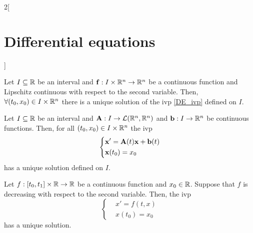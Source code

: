 \documentclass[../../../main.tex]{subfiles}
\begin{document}
\begin{multicols}{2}[\section{Differential equations}]
\begin{corollary}
  \end{corollary}
  \begin{prop}
    Let $I\subseteq\mathbb{R}$ be an interval and $\boldsymbol{\mathrm{f}}:I\times\mathbb{R}^n\rightarrow\mathbb{R}^n$ be a continuous function and Lipschitz continuous with respect to the second variable. Then, $\forall(t_0,x_0)\in I\times\mathbb{R}^n$ there is a unique solution of the ivp \eqref{DE_ivp} defined on $I$.
  \end{prop}
  \begin{corollary}
    Let $I\subseteq\mathbb{R}$ be an interval and $\boldsymbol{\mathrm{A}}:I\rightarrow\mathcal{L}(\mathbb{R}^n,\mathbb{R}^n)$ and $\boldsymbol{\mathrm{b}}:I\rightarrow\mathbb{R}^n$ be continuous functions. Then, for all $(t_0,x_0)\in I\times\mathbb{R}^n$ the ivp
    $$
      \left\{
      \begin{aligned}
         & \boldsymbol{\mathrm{x}}'=\boldsymbol{\mathrm{A}}(t)\boldsymbol{\mathrm{x}}+\boldsymbol{\mathrm{b}}(t) \\
         & \boldsymbol{\mathrm{x}}(t_0)=x_0
      \end{aligned}
      \right.
    $$
    has a unique solution defined on $I$.
  \end{corollary}
  \begin{theorem}
    Let $f:[t_0,t_1]\times\mathbb{R}\rightarrow\mathbb{R}$ be a continuous function and $x_0\in \mathbb{R}$. Suppose that $f$ is decreasing with respect to the second variable. Then, the ivp
    \begin{equation*}
      \left\{
      \begin{aligned}
         & x'=f(t,x)  \\
         & x(t_0)=x_0
      \end{aligned}
      \right.
    \end{equation*}
    has a unique solution.
  \end{theorem}

\end{multicols}
\end{document}
